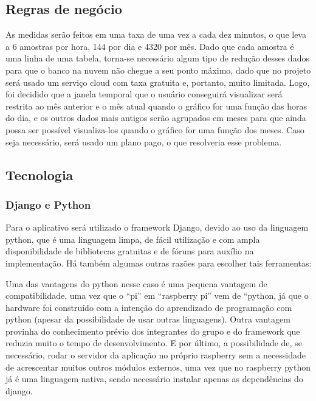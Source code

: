 \subsection{Regras de negócio}

As medidas serão feitos em uma taxa de uma vez a cada dez minutos, o que leva a 6 amostras por hora, 144 por dia e 4320 por mês. Dado que cada amostra é uma linha de uma tabela, torna-se necessário algum tipo de redução desses dados para que o banco na nuvem não chegue a seu ponto máximo, dado que no projeto será usado um serviço cloud com taxa gratuita e, portanto, muito limitada. Logo, foi decidido que a janela temporal que o usuário conseguirá visualizar será restrita ao mês anterior e o mês atual quando o gráfico for uma função das horas do dia, e os outros dados mais antigos serão agrupados em meses para que ainda possa ser possível visualiza-los quando o gráfico for uma função dos meses. Caso seja necessário, será usado um plano pago, o que resolveria esse problema.

\subsection{Tecnologia}

\subsubsection{Django e Python}

Para o aplicativo será utilizado o framework Django, devido ao uso da linguagem python, que é uma linguagem limpa, de fácil utilização e com ampla disponibilidade de bibliotecas gratuitas e de fóruns para auxílio na implementação.
Há também algumas outras razões para escolher tais ferramentas:

Uma das vantagens do python nesse caso é uma pequena vantagem de compatibilidade, uma vez que o ``pi'' em ``raspberry pi'' vem de ``python, já que o hardware foi construído com a intenção do aprendizado de programação com python \cite{raspberry_pi_site} (apesar da possibilidade de usar outras linguagens). Outra vantagem provinha do conhecimento prévio dos integrantes do grupo e do framework que reduzia muito o tempo de desenvolvimento. E por último, a possibilidade de, se necessário, rodar o servidor da aplicação no próprio raspberry sem a necessidade de acrescentar muitos outros módulos externos, uma vez que no raspberry python já é uma linguagem nativa, sendo necessário instalar apenas as dependências do django.

